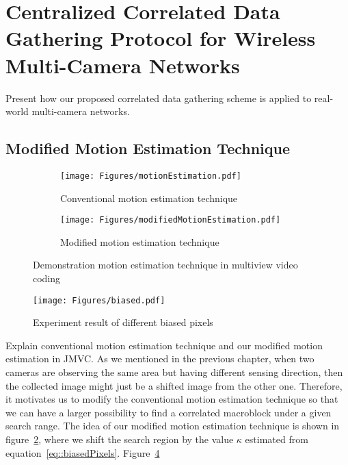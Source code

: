 \section{Centralized Correlated Data Gathering Protocol for Wireless Multi-Camera Networks}
\label{sec::protocolDesign}
{\color{red} Present how our proposed correlated data gathering scheme is applied to real-world multi-camera networks.}
%
\subsection{Modified Motion Estimation Technique}
%
\begin{figure}
\begin{subfigure}[b]{\columnwidth}
\begin{center}
\texttt{[image: Figures/motionEstimation.pdf]}
\caption{\label{fig::originalME}Conventional motion estimation technique}
\end{center}
\end{subfigure}
%
\begin{subfigure}[b]{\columnwidth}
\begin{center}
\texttt{[image: Figures/modifiedMotionEstimation.pdf]}
\caption{\label{fig::modifiedME}Modified motion estimation technique}
\end{center}
\end{subfigure}
\caption{\label{fig::originalAndModifiedME}Demonstration motion estimation technique in multiview video coding}
\end{figure}
%
\begin{figure}
\begin{center}
\texttt{[image: Figures/biased.pdf]}
\caption{\label{fig::biased}Experiment result of different biased pixels}
\end{center}
\end{figure}
{\color{red} Explain conventional motion estimation technique and our modified motion estimation in JMVC.}
As we mentioned in the previous chapter, when two cameras are observing the same area but having different sensing direction, then the collected image might just be a shifted image from the other one.
Therefore, it motivates us to modify the conventional motion estimation technique so that we can have a larger possibility to find a correlated macroblock under a given search range.
The idea of our modified motion estimation technique is shown in figure~\ref{fig::modifiedME}, where we shift the search region by the value $\kappa$ estimated from equation~\eqref{eq::biasedPixels}.
Figure~\ref{fig::biased}